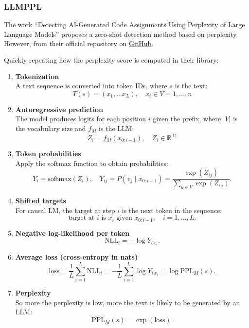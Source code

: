 \subsubsection{LLMPPL}
The work “Detecting AI-Generated Code Assignments Using Perplexity 
of Large Language Models” proposes a zero-shot detection method based 
on perplexity. However, from their official repository on 
\href{https://github.com/Arrtourz/llmppl}{GitHub}.

Quickly repeating how the perplexity score is computed in their library:
\begin{enumerate}
    \item \textbf{Tokenization} \\
    A text sequence is converted into token IDs, where $s$ is the text:
    \[
        T(s) = (x_1, \dots x_L), \quad  x_i \in V = {1, \dots, n}
    \]

    \item \textbf{Autoregressive prediction} \\
    The model produces logits for each position $i$ given the prefix, 
    where $|V|$ is the vocabulary size and $f_M$ is the LLM:
    \[
        Z_i = f_M(x_{0:i-1}), \quad Z_i \in \mathbb{R}^{|V|}
    \]

    \item \textbf{Token probabilities} \\
    Apply the softmax function to obtain probabilities:
    \[
        Y_i=\mathrm{softmax}(Z_i), \quad
        Y_{ij}=P(v_j \mid x_{0:i-1})=\frac{\exp(Z_{ij})}{\sum_{u\in V}\exp(Z_{iu})}.
    \]

    \item \textbf{Shifted targets} \\
    For causal LM, the target at step $i$ is the next token in the sequence:
    \[
        \text{target at } i \text{ is } x_i \text{ given } x_{0:i-1}, \quad i=1,\dots,L.
    \]

    \item \textbf{Negative log-likelihood per token} \\
    \[
        \mathrm{NLL}_i = -\log Y_{i\,x_i}.
    \]

    \item \textbf{Average loss (cross-entropy in nats)} \\
    \[
        \mathrm{loss}=\frac{1}{L}\sum_{i=1}^{L}\mathrm{NLL}_i
        =-\frac{1}{L}\sum_{i=1}^{L}\log Y_{i\,x_i}
        =\log\mathrm{PPL}_M(s).
    \]

    \item \textbf{Perplexity} \\
    So more the perplexity is low, more the text is likely to be generated by an LLM:
    \[
        \mathrm{PPL}_M(s)=\exp(\mathrm{loss}).
    \]
\end{enumerate}


